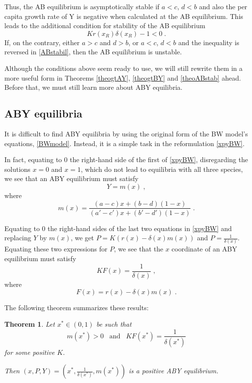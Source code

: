 \documentclass[12pt]{article}
\newtheorem{theorem}{Theorem}[section]
\theoremstyle{definition}
\begin{document}
Thus, the AB equilibrium is asymptotically stable if $a<c$, $d<b$ and also the per capita growth rate of Y is negative when calculated at the AB equilibrium. This leads to the additional condition for stability of the AB equilibrium
\begin{equation} \label{ABstabil}
	K r(x_R) \delta(x_R)-1<0\;.
\end{equation}
If, on the contrary, either $a>c$ and $d>b$, or  $a<c$, $d<b$ and the inequality is reversed in \eqref{ABstabil}, then the AB equilibrium is unstable.

Although the conditions above seem ready to use, we will still rewrite them in a more useful form in Theorems \ref{theogtAY}, \ref{theogtBY} and \ref{theoABstab} ahead. Before that, we must still learn more about ABY equilibria.


\subsection{ABY equilibria}
It is difficult to find ABY equilibria by using the original form of the BW model's equations, \eqref{BWmodel}. Instead, it is a simple task in the reformulation \eqref{xpyBW}.

In fact, equating to 0 the right-hand side of the first of \eqref{xpyBW}, disregarding the solutions $x=0$ and $x=1$, which do not lead to equilibria with all three species, we see that an ABY equilibrium must satisfy
\[Y=m(x)\;,\]
where
\begin{equation} \label{defm}
	m(x) = \frac{(a-c)x+(b-d)(1-x)}{(a'-c')x+(b'-d')(1-x)}\;.
\end{equation}


Equating to 0 the right-hand sides of the last two equations in \eqref{xpyBW} and replacing $Y$ by $m(x)$, we get $P = K(r(x) -\delta(x)m(x))$ and $P = \frac{1}{\delta(x)}$. Equating these two expressions for $P$, we see that the $x$ coordinate of an ABY equilibrium must satisfy
\begin{equation} \label{ABYeq}
	K F(x)= \frac{1}{\delta(x)}\;,
\end{equation}
where
\begin{equation} \label{defF}
	F(x)= r(x) -\delta(x)m(x)\;.  
\end{equation}

The following theorem summarizes these results:
\begin{theorem}  \label{theoABYeq}
	Let $x^* \in (0,1)$ be such that
	\[m(x^*)>0\;\;\;\mathrm{and}\;\;\;K F(x^*)= \frac{1}{\delta(x^*)}\]
	for some positive $K$.
	
	Then $(x,P,Y)=(x^*,\frac{1}{\delta(x^*)},m(x^*))$ is a positive ABY equilibrium.
\end{theorem}
\end{document}
